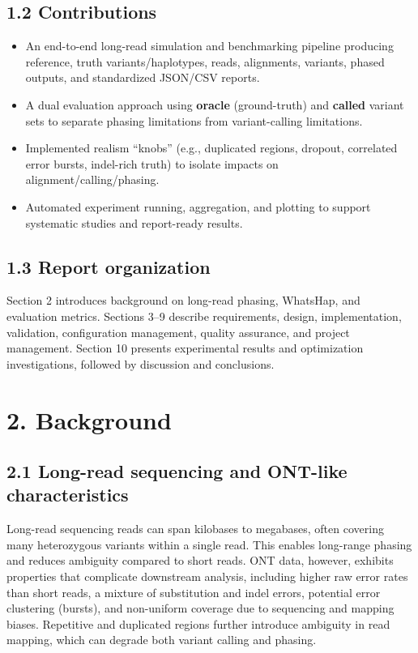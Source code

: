 \documentclass[
]{article}
\providecommand{\tightlist}{%
  \setlength{\itemsep}{0pt}\setlength{\parskip}{0pt}}
\begin{document}
\subsection{1.2 Contributions}\label{contributions}

\begin{itemize}
\tightlist
\item
  An end-to-end long-read simulation and benchmarking pipeline producing
  reference, truth variants/haplotypes, reads, alignments, variants,
  phased outputs, and standardized JSON/CSV reports.
\item
  A dual evaluation approach using \textbf{oracle} (ground-truth) and
  \textbf{called} variant sets to separate phasing limitations from
  variant-calling limitations.
\item
  Implemented realism ``knobs'' (e.g., duplicated regions, dropout,
  correlated error bursts, indel-rich truth) to isolate impacts on
  alignment/calling/phasing.
\item
  Automated experiment running, aggregation, and plotting to support
  systematic studies and report-ready results.
\end{itemize}

\subsection{1.3 Report organization}\label{report-organization}

Section 2 introduces background on long-read phasing, WhatsHap, and
evaluation metrics. Sections 3--9 describe requirements, design,
implementation, validation, configuration management, quality assurance,
and project management. Section 10 presents experimental results and
optimization investigations, followed by discussion and conclusions.

\section{2. Background}\label{background}

\subsection{2.1 Long-read sequencing and ONT-like
characteristics}\label{long-read-sequencing-and-ont-like-characteristics}

Long-read sequencing reads can span kilobases to megabases, often
covering many heterozygous variants within a single read. This enables
long-range phasing and reduces ambiguity compared to short reads. ONT
data, however, exhibits properties that complicate downstream analysis,
including higher raw error rates than short reads, a mixture of
substitution and indel errors, potential error clustering (bursts), and
non-uniform coverage due to sequencing and mapping biases. Repetitive
and duplicated regions further introduce ambiguity in read mapping,
which can degrade both variant calling and phasing.
\end{document}
